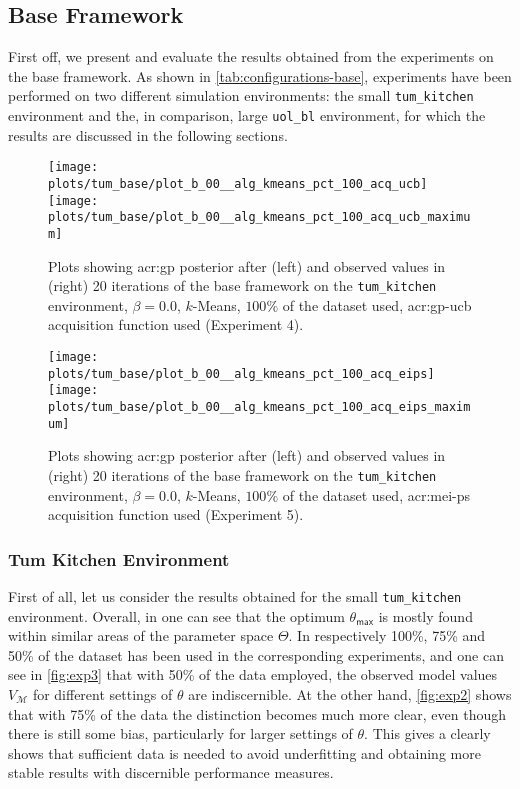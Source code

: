 \subsection{Base Framework}
\label{sec:base-framework-results}

First off, we present and evaluate the results obtained from the experiments on the base framework.
As shown in \autoref{tab:configurations-base}, experiments have been performed on two different simulation environments: the small \texttt{tum\_kitchen} environment and the, in comparison, large \texttt{uol\_bl} environment, for which the results are discussed in the following sections.

	\begin{figure}
		\centering
		\texttt{[image: plots/tum\_base/plot\_b\_00\_\_alg\_kmeans\_pct\_100\_acq\_ucb]}
		\texttt{[image: plots/tum\_base/plot\_b\_00\_\_alg\_kmeans\_pct\_100\_acq\_ucb\_maximum]}
		\caption{Plots showing \acrshort{acr:gp}  posterior after (left) and observed values in (right) 20 iterations of the base framework on the \texttt{tum\_kitchen} environment, $\beta = 0.0$, $k$-Means, $100\%$ of the dataset used, \acrshort{acr:gp-ucb} acquisition function used (Experiment 4).}
		\label{fig:exp4}
	\end{figure}
	\begin{figure}
		\centering
		\texttt{[image: plots/tum\_base/plot\_b\_00\_\_alg\_kmeans\_pct\_100\_acq\_eips]}
		\texttt{[image: plots/tum\_base/plot\_b\_00\_\_alg\_kmeans\_pct\_100\_acq\_eips\_maximum]}
		\caption{Plots showing \acrshort{acr:gp} posterior after (left) and observed values in (right) 20 iterations of the base framework on the \texttt{tum\_kitchen} environment, $\beta = 0.0$, $k$-Means, $100\%$ of the dataset used, \acrshort{acr:mei-ps} acquisition function used (Experiment 5).}
		\label{fig:exp5}
	\end{figure}

\subsubsection{Tum Kitchen Environment}

First of all, let us consider the results obtained for the small \texttt{tum\_kitchen} environment.
Overall, in  one can see that the optimum $\theta_\mathsf{max}$ is mostly found within similar areas of the parameter space $\Theta$.
In  respectively 100\%, 75\% and 50\% of the dataset has been used in the corresponding experiments, and one can see in \autoref{fig:exp3} that with 50\% of the data employed, the observed model values $V_\mathcal{M}$ for different settings of $\theta$ are indiscernible.
At the other hand, \autoref{fig:exp2} shows that with 75\% of the data the distinction becomes much more clear, even though there is still some bias, particularly for larger settings of $\theta$.
This gives a clearly shows that sufficient data is needed to avoid underfitting and obtaining more stable results with discernible performance measures.

